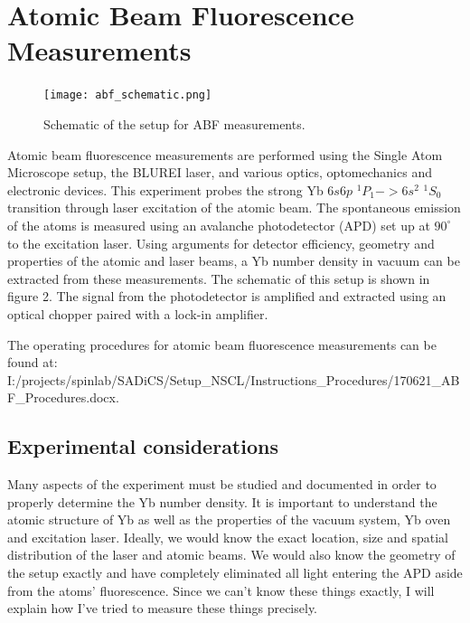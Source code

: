 \documentclass[12pt, a4paper]{article}
\begin{document}
\section{Atomic Beam Fluorescence Measurements}
\begin{figure}
  \texttt{[image: abf\_schematic.png]}
  \vspace*{-3mm}
  \caption{Schematic of the setup for ABF measurements.}
\end{figure}
Atomic beam fluorescence measurements are performed using the Single Atom Microscope setup, the BLUREI laser, and various optics, optomechanics and electronic devices. This experiment probes the strong Yb $6s6p$ $ ^{1}P_{1} -> 6s^2 $ $^{1}S_{0}$ transition through laser excitation of the atomic beam. The spontaneous emission of the atoms is measured using an avalanche photodetector (APD) set up at $90^{\circ}$ to the excitation laser. Using arguments for detector efficiency, geometry and properties of the atomic and laser beams, a Yb number density in vacuum can be extracted from these measurements. The schematic of this setup is shown in figure 2. The signal from the photodetector is amplified and extracted using an optical chopper paired with a lock-in amplifier.

The operating procedures for atomic beam fluorescence measurements can be found at: \footnotesize I:/projects/spinlab/SADiCS/Setup\_NSCL/Instructions\_Procedures/170621\_ABF\_Procedures.docx.\normalsize
 
\subsection{Experimental considerations}
Many aspects of the experiment must be studied and documented in order to properly determine the Yb number density. It is important to understand the atomic structure of Yb as well as the properties of the vacuum system, Yb oven and excitation laser. Ideally, we would know the exact location, size and spatial distribution of the laser and atomic beams. We would also know the geometry of the setup exactly and have completely eliminated all light entering the APD aside from the atoms' fluorescence. Since we can't know these things exactly, I will explain how I've tried to measure these things precisely. 
\end{document}
